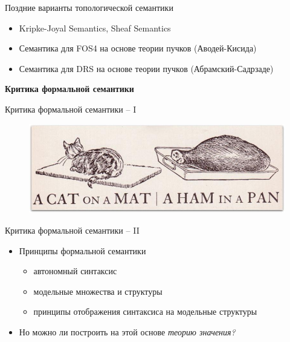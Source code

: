 \documentclass{beamer}
\begin{document}
\begin{frame}{Поздние варианты топологической семантики}
\begin{itemize}
    \item Kripke-Joyal Semantics, Sheaf Semantics
    \medskip
    \item Семантика для FOS4 на основе теории пучков (Аводей-Кисида)
    \medskip
    \item Семантика для DRS на основе теории пучков (Абрамский-Садрзаде)
\end{itemize}
\end{frame}

\begin{frame}{}
\begin{center}
	\textbf{Критика формальной семантики}
\end{center}
\end{frame}

\begin{frame}{Критика формальной семантики -- I}
\begin{center}
	\begin{figure}[H]
		\includegraphics[scale=0.39]{cat_mat.jpg} 
	\end{figure}
\end{center}
\end{frame}

\begin{frame}{Критика формальной семантики -- II}
\begin{itemize}
    \item Принципы формальной семантики
    \medskip
        \begin{itemize}
            \item автономный синтаксис
            \medskip
            \item модельные множества и структуры
            \medskip
            \item принципы отображения синтаксиса на модельные структуры
        \end{itemize}
    \medskip
    \item Но можно ли построить на этой основе \textit{теорию значения?}
\end{itemize}
\end{frame}
\end{document}
